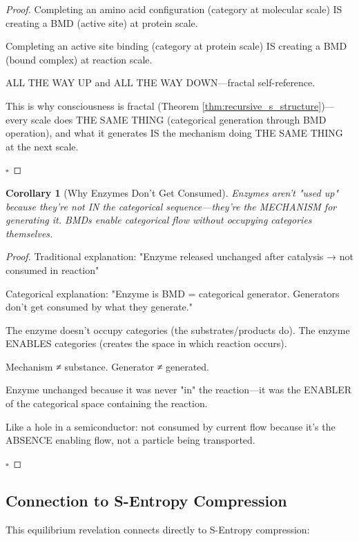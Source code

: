 \documentclass[12pt,a4paper]{article}
\newtheorem{corollary}[theorem]{Corollary}
\begin{document}
\begin{proof}
Completing an amino acid configuration (category at molecular scale) IS creating a BMD (active site) at protein scale.

Completing an active site binding (category at protein scale) IS creating a BMD (bound complex) at reaction scale.

ALL THE WAY UP and ALL THE WAY DOWN—fractal self-reference.

This is why consciousness is fractal (Theorem \ref{thm:recursive_s_structure})—every scale does THE SAME THING (categorical generation through BMD operation), and what it generates IS the mechanism doing THE SAME THING at the next scale.

$\square$
\end{proof}

\begin{corollary}[Why Enzymes Don't Get Consumed]
\label{cor:enzymes_not_consumed_stellas}
Enzymes aren't "used up" because they're not IN the categorical sequence—they're the MECHANISM for generating it. BMDs enable categorical flow without occupying categories themselves.
\end{corollary}

\begin{proof}
Traditional explanation: "Enzyme released unchanged after catalysis → not consumed in reaction"

Categorical explanation: "Enzyme is BMD = categorical generator. Generators don't get consumed by what they generate."

The enzyme doesn't occupy categories (the substrates/products do).
The enzyme ENABLES categories (creates the space in which reaction occurs).

Mechanism ≠ substance.
Generator ≠ generated.

Enzyme unchanged because it was never "in" the reaction—it was the ENABLER of the categorical space containing the reaction.

Like a hole in a semiconductor: not consumed by current flow because it's the ABSENCE enabling flow, not a particle being transported.

$\square$
\end{proof}

\subsection{Connection to S-Entropy Compression}

This equilibrium revelation connects directly to S-Entropy compression:
\end{document}
